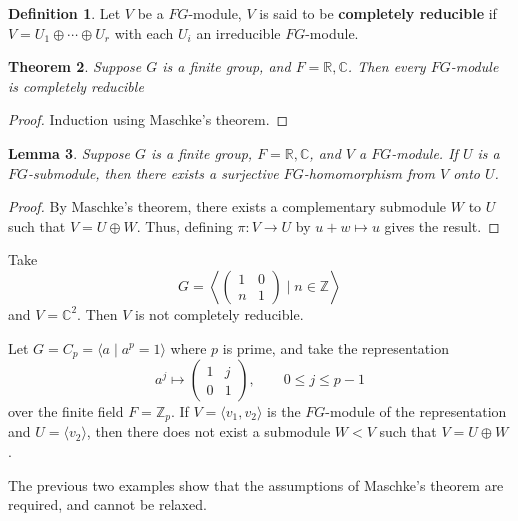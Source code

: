 \documentclass[11pt, notitlepage]{article}
\numberwithin{equation}{section}
\theoremstyle{plain}
\newtheorem{theorem}{Theorem}[section]
\newtheorem{lemma}[theorem]{Lemma}
\theoremstyle{definition}
\newtheorem{definition}[theorem]{Definition}
\newenvironment{example}
	{\pushQED{\qed}\renewcommand{\qedsymbol}{$\blacktriangleleft$}\examplex}
	{\popQED\endexamplex}
\newcommand{\R}{\mathbb{R}}
\newcommand{\C}{\mathbb{C}}
\newcommand{\Z}{\mathbb{Z}}
\begin{document}
\begin{definition}
Let $V$ be a $FG$-module, $V$ is said to be \textbf{completely reducible} if $V = U_1 \oplus \cdots \oplus U_r$ with each $U_i$ an irreducible $FG$-module.
\end{definition}

\begin{theorem}
Suppose $G$ is a finite group, and $F = \R,\C$. Then every $FG$-module is completely reducible
\end{theorem}

\begin{proof}
Induction using Maschke's theorem.
\end{proof}

\begin{lemma}
Suppose $G$ is a finite group, $F = \R,\C$, and $V$ a $FG$-module. If $U$ is a $FG$-submodule, then there exists a surjective $FG$-homomorphism from $V$ onto $U$.
\end{lemma}

\begin{proof}
By Maschke's theorem, there exists a complementary submodule $W$ to $U$ such that $V = U \oplus W$. Thus, defining $\pi : V \to U$ by $u + w \mapsto u$ gives the result.
\end{proof}


\begin{example}
Take
\[
    G = \left\langle \begin{pmatrix*}
        1 & 0 \\ n & 1
    \end{pmatrix*} \mid n \in \Z \right\rangle
\]
and $V = \C^2$. Then $V$ is not completely reducible.
\end{example}


\begin{example}
Let $G = C_p = \langle a \mid a^p = 1 \rangle$ where $p$ is prime, and take the representation
\[
    a^j \mapsto \begin{pmatrix*}
        1 & j\\ 0 & 1
    \end{pmatrix*}, \qquad 0 \le j \le p-1
\]
over the finite field $F = \Z_p$. If $V = \langle v_1, v_2 \rangle$ is the $FG$-module of the representation and $U= \langle v_2 \rangle$, then there does not exist a submodule $W < V$ such that $V = U \oplus W$.
\end{example}

The previous two examples show that the assumptions of Maschke's theorem are required, and cannot be relaxed.
\end{document}
